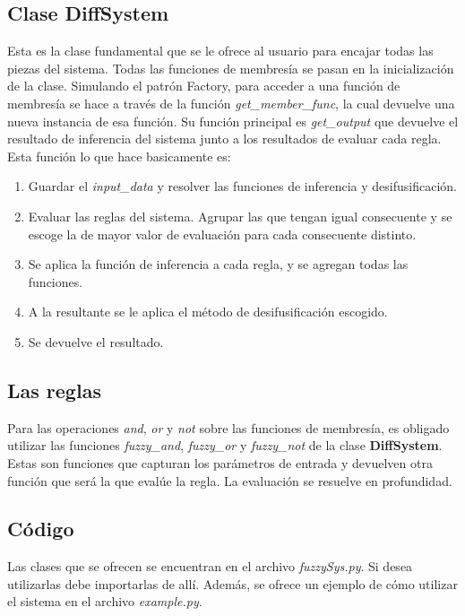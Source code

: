 \documentclass[11pt]{article}
\begin{document}
\subsection{Clase DiffSystem}
Esta es la clase fundamental que se le ofrece al usuario para encajar todas las piezas del sistema. Todas las funciones de membres\'ia se pasan en la inicializaci\'on de la clase. Simulando el patr\'on Factory, para acceder a una funci\'on de membres\'ia se hace a trav\'es de la funci\'on \emph{get\_member\_func}, la cual devuelve una nueva instancia de esa funci\'on. Su funci\'on principal es \emph{get\_output} que devuelve el resultado de inferencia del sistema junto a los resultados de evaluar cada regla. Esta funci\'on lo que hace basicamente es:
\begin{enumerate}
	\item Guardar el \emph{input\_data} y resolver las funciones de inferencia y desifusificaci\'on.
	\item Evaluar las reglas del sistema. Agrupar las que tengan igual consecuente y se escoge la de mayor valor de evaluaci\'on para cada consecuente distinto.
	\item Se aplica la funci\'on de inferencia a cada regla, y se agregan todas las funciones.
	\item A la resultante se le aplica el m\'etodo de desifusificaci\'on escogido.
	\item Se devuelve el resultado.
\end{enumerate}
\subsection{Las reglas}
Para las operaciones \emph{and}, \emph{or} y \emph{not} sobre las funciones de membres\'ia, es obligado utilizar las funciones \emph{fuzzy\_and}, \emph{fuzzy\_or} y \emph{fuzzy\_not} de la clase \textbf{DiffSystem}. Estas son funciones que capturan los par\'ametros de entrada y devuelven otra funci\'on que ser\'a la que eval\'ue la regla. La evaluaci\'on se resuelve en profundidad.
\subsection{C\'odigo}
Las clases que se ofrecen se encuentran en el archivo \emph{fuzzySys.py}. Si desea utilizarlas debe importarlas de all\'i. Adem\'as, se ofrece un ejemplo de c\'omo utilizar el sistema en el archivo \emph{example.py}.
\end{document}
